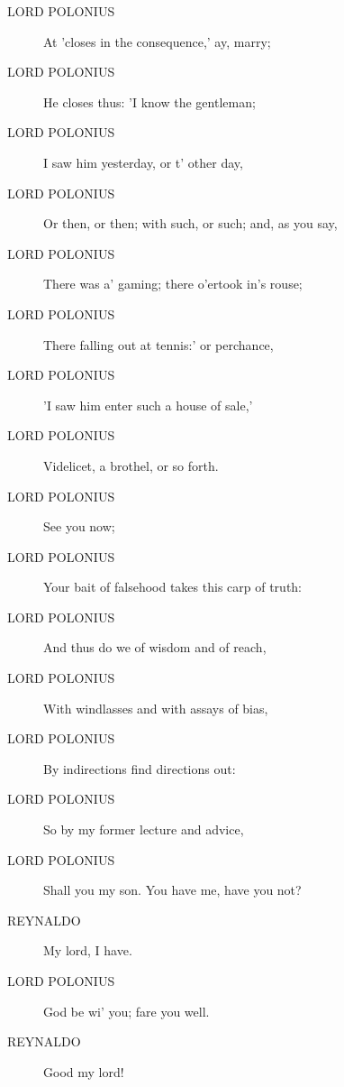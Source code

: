 \documentclass{article}
\begin{document}
\begin{description}
            
\item[LORD POLONIUS] At 'closes in the consequence,' ay, marry;
\item[LORD POLONIUS] He closes thus: 'I know the gentleman;
\item[LORD POLONIUS] I saw him yesterday, or t' other day,
\item[LORD POLONIUS] Or then, or then; with such, or such; and, as you say,
\item[LORD POLONIUS] There was a' gaming; there o'ertook in's rouse;
\item[LORD POLONIUS] There falling out at tennis:' or perchance,
\item[LORD POLONIUS] 'I saw him enter such a house of sale,'
\item[LORD POLONIUS] Videlicet, a brothel, or so forth.
\item[LORD POLONIUS] See you now;
\item[LORD POLONIUS] Your bait of falsehood takes this carp of truth:
\item[LORD POLONIUS] And thus do we of wisdom and of reach,
\item[LORD POLONIUS] With windlasses and with assays of bias,
\item[LORD POLONIUS] By indirections find directions out:
\item[LORD POLONIUS] So by my former lecture and advice,
\item[LORD POLONIUS] Shall you my son. You have me, have you not?
\end{description}
          
\begin{description}
            
\item[REYNALDO] My lord, I have.
\end{description}
          
\begin{description}
            
\item[LORD POLONIUS] God be wi' you; fare you well.
\end{description}
          
\begin{description}
            
\item[REYNALDO] Good my lord!
\end{description}
          
\end{document}

